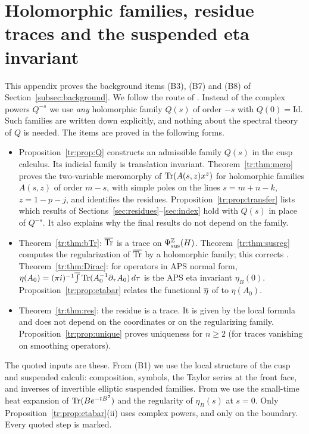 \section{Holomorphic families, residue traces and the suspended eta invariant}
\label{tr:sec}

\providecommand{\trOp}{\operatorname{Op}}
\providecommand{\trOpc}{\operatorname{Op}_c}
\providecommand{\trang}[1]{\langle #1\rangle}
\providecommand{\trbint}{\overline{\int}}
\providecommand{\trres}{\operatorname{res}}
\providecommand{\trTrt}{\widetilde{\Tr}}
\providecommand{\trRN}[1]{\overline{\R^{#1}}}
\providecommand{\trP}{\mathcal P}
\providecommand{\trad}{\operatorname{ad}}

This appendix proves the background items (B3), (B7) and (B8) of
Section~\ref{subsec:background}. We follow the route of
\cite[Chs.~6 and 15]{MelroseMicro}. Instead of the complex powers
\(Q^{-s}\) we use \emph{any} holomorphic family \(Q(s)\) of order \(-s\) with
\(Q(0)=\mathrm{Id}\). Such families are written down explicitly, and nothing
about the spectral theory of \(Q\) is needed. The items are proved in the
following forms.
\begin{itemize}
\item[(B3\('\))] Proposition~\ref{tr:prop:Q} constructs an admissible family
\(Q(s)\) in the cusp calculus. Its indicial family is translation
invariant. Theorem~\ref{tr:thm:mero} proves the two-variable meromorphy of
\(\operatorname{Tr}(A(s,z)x^z)\) for holomorphic families \(A(s,z)\) of order \(m-s\),
with simple poles on the lines \(s=m+n-k\), \(z=1-p-j\), and identifies the
residues. Proposition~\ref{tr:prop:transfer} lists which results of
Sections~\ref{sec:residues}--\ref{sec:index} hold with \(Q(s)\) in place of
\(Q^{-s}\). It also explains why the final results do not depend on the
family.
\item[(B7\('\))] Theorem~\ref{tr:thm:bTr}: \(\overline{\operatorname{Tr}}\) is a trace on
\(\Psi_{\mathrm{sus}}^{\mathbb Z}(H)\). Theorem~\ref{tr:thm:susreg} computes the
regularization of \(\overline{\operatorname{Tr}}\) by a holomorphic family; this corrects
\cite[Prop.~8]{MN}. Theorem~\ref{tr:thm:Dirac}: for operators in APS
normal form,
\(\eta(A_0)=(\pi i)^{-1}\overline{\int}\operatorname{Tr}(A_0^{-1}\partial_\tau A_0)\,d\tau\)
is the APS eta invariant \(\eta_{B}(0)\). Proposition~\ref{tr:prop:etabar}
relates the functional \(\overline\eta\) of \cite[(89)]{MN} to \(\eta(A_0)\).
\item[(B8\('\))] Theorem~\ref{tr:thm:res}: the residue is a trace. It is
given by the local formula and does not depend on the coordinates or on the
regularizing family. Proposition~\ref{tr:prop:unique} proves uniqueness for
\(n\ge2\) (for traces vanishing on smoothing operators).
\end{itemize}
The quoted inputs are these. From (B1) we use the local structure of the
cusp and suspended calculi: composition, symbols, the Taylor series at the
front face, and inverses of invertible elliptic suspended families. From
\cite{Notes} we use the small-time heat expansion of \(\operatorname{Tr}(Be^{-tB^2})\)
and the regularity of \(\eta_B(s)\) at \(s=0\). Only
Proposition~\ref{tr:prop:etabar}(ii) uses complex powers, and only on the
boundary. Every quoted step is marked.

